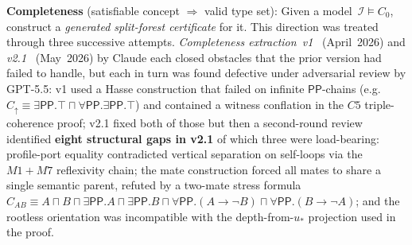 \documentclass[
]{ceurart}
\theoremstyle{definition}
\newcommand{\PP}{\ensuremath{\mathsf{PP}}}
\begin{document}
\textbf{Completeness} (satisfiable concept $\Rightarrow$
valid type set):
Given a model~$\mathcal{I} \models C_0$, construct a
\emph{generated split-forest certificate} for it.  This direction
was treated through three successive attempts.
\textit{Completeness extraction~v1}~\cite{CompletenessExtractionV1}
(April~2026) and \textit{v2.1}~\cite{CompletenessExtraction}
(May~2026) by Claude each closed obstacles that the prior version
had failed to handle, but each in turn was found defective under
adversarial review by GPT-5.5: v1 used a Hasse construction that
failed on infinite $\PP$-chains (e.g.\ $C_\uparrow \equiv
\exists\PP.\top \sqcap \forall\PP.\exists\PP.\top$) and contained a
witness conflation in the $C5$ triple-coherence proof; v2.1 fixed
both of those but then a second-round review identified
\textbf{eight structural gaps in v2.1} of which three were
load-bearing: profile-port equality contradicted vertical
separation on self-loops via the $M1{+}M7$ reflexivity chain; the
mate construction forced all mates to share a single semantic
parent, refuted by a two-mate stress formula
$C_{AB} \equiv A \sqcap B \sqcap \exists\PP.A \sqcap \exists\PP.B
\sqcap \forall\PP.(A\to\lnot B) \sqcap \forall\PP.(B\to\lnot A)$;
and the rootless orientation was incompatible with the
depth-from-$u_*$ projection used in the proof.
\end{document}
